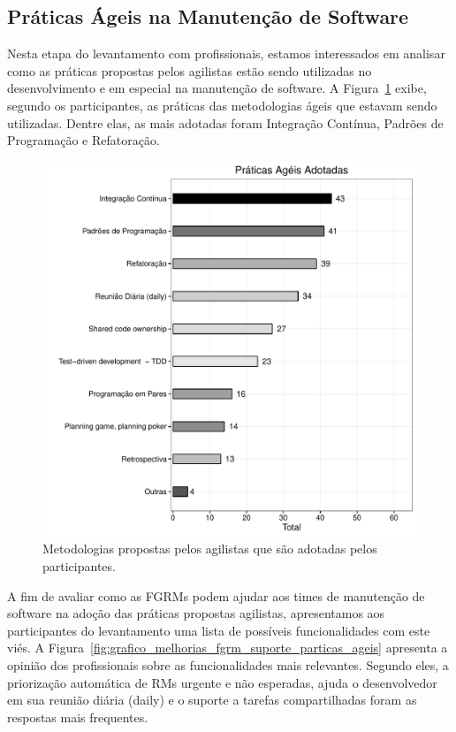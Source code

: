 \subsection{Práticas Ágeis na Manutenção de Software}
\label{sub:práticas_ágeis_na_manutenção_de_software}

Nesta etapa do levantamento com profissionais, estamos interessados em analisar
como as práticas propostas pelos agilistas estão sendo utilizadas no
desenvolvimento e em especial na manutenção de software. A
Figura~\ref{fig:grafico_melhorias_fgrm_praticas_ageis_adotadas} exibe, segundo
os participantes, as práticas das metodologias ágeis que estavam sendo
utilizadas. Dentre elas, as mais adotadas foram Integração Contínua, Padrões de
Programação e Refatoração.

\begin{figure}[htpb]
	\centering
	\includegraphics[width=0.8\linewidth]{./chapter-pesquisa-com-profissionais/img/grafico_melhorias_fgrm_praticas_ageis_adotadas.pdf}
	\caption{Metodologias propostas pelos agilistas que são adotadas pelos
		participantes.}
\label{fig:grafico_melhorias_fgrm_praticas_ageis_adotadas}
\end{figure}

A fim de avaliar como as FGRMs podem ajudar aos times de manutenção de software
na adoção das práticas propostas agilistas, apresentamos aos participantes do
levantamento uma lista de possíveis funcionalidades com este viés. A
Figura~\ref{fig:grafico_melhorias_fgrm_suporte_particas_ageis} apresenta a
opinião dos profissionais sobre as funcionalidades mais relevantes. Segundo
eles, a priorização automática de RMs urgente e não esperadas, ajuda o
desenvolvedor em sua reunião diária (daily) e o suporte a tarefas compartilhadas
foram as respostas mais frequentes.

